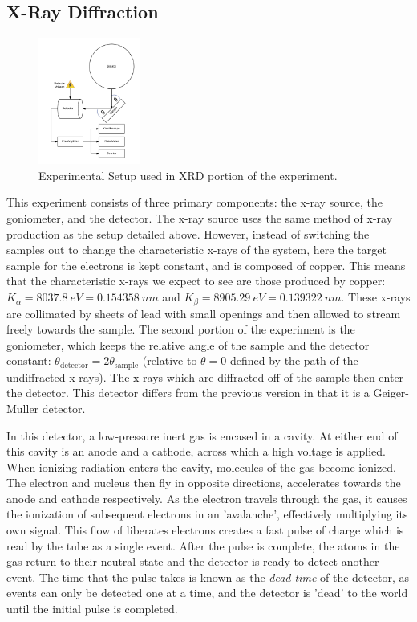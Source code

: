 \documentclass[%
 reprint,
 amsmath,amssymb,
 aps,
 pra,
]{revtex4-1}
\begin{document}
\subsection{X-Ray Diffraction}

\begin{figure}[H]
	\centering
	\includegraphics[width=0.3\textwidth]{xrd_experiment.png}
	\caption{Experimental Setup used in XRD portion of the experiment.}
	\label{fig:xrd_setup}
\end{figure}

This experiment consists of three primary components: the x-ray source, the goniometer, and the detector. The x-ray source uses the same method of x-ray production as the setup detailed above. However, instead of switching the samples out to change the characteristic x-rays of the system, here the target sample for the electrons is kept constant, and is composed of copper. This means that the characteristic x-rays we expect to see are those produced by copper: $K_\alpha = 8037.8 ~eV= 0.154358 ~nm$ and $K_\beta = 8905.29 ~eV = 0.139322 ~nm$. These x-rays are collimated by sheets of lead with small openings and then allowed to stream freely towards the sample. The second portion of the experiment is the goniometer, which keeps the relative angle of the sample and the detector constant: $\theta_{\text{detector}} = 2\theta_{\text{sample}}$ (relative to $\theta = 0$ defined by the path of the undiffracted x-rays). The x-rays which are diffracted off of the sample then enter the detector. This detector differs from the previous version in that it is a Geiger-Muller detector. 

In this detector, a low-pressure inert gas is encased in a cavity. At either end of this cavity is an anode and a cathode, across which a high voltage is applied. When ionizing radiation enters the cavity, molecules of the gas become ionized. The electron and nucleus then fly in opposite directions, accelerates towards the anode and cathode respectively. As the electron travels through the gas, it causes the ionization of subsequent electrons in an 'avalanche', effectively multiplying its own signal. This flow of liberates electrons creates a fast pulse of charge which is read by the tube as a single event. After the pulse is complete, the atoms in the gas return to their neutral state and the detector is ready to detect another event. The time that the pulse takes is known as the \textit{dead time} of the detector, as events can only be detected one at a time, and the detector is 'dead' to the world until the initial pulse is completed. 
\end{document}
